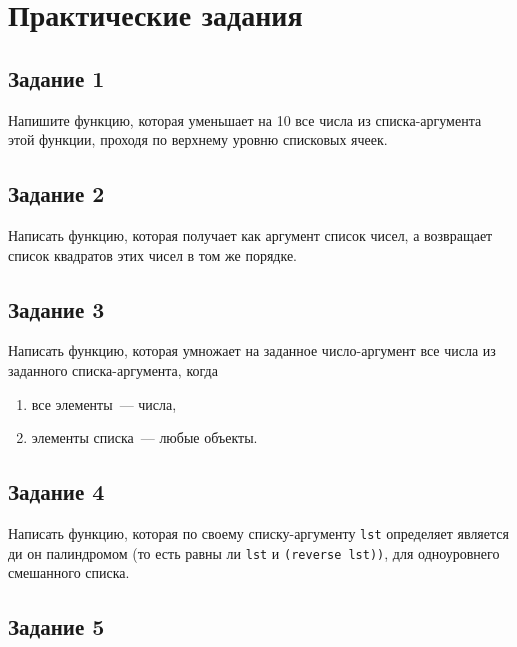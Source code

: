 \chapter{Практические задания}

\section{Задание 1}

Напишите функцию, которая уменьшает на 10 все числа из списка-аргумента этой функции, проходя по верхнему уровню списковых ячеек.


\section{Задание 2}

Написать функцию, которая получает как аргумент список чисел, а возвращает список квадратов этих чисел в том же порядке.


\section{Задание 3}

Написать функцию, которая умножает на заданное число-аргумент все числа из заданного списка-аргумента, когда
\begin{enumerate}[label=\alph*)]
	\item все элементы~--- числа,
	\item элементы списка~--- любые объекты.
\end{enumerate}


\section{Задание 4}

Написать функцию, которая по своему списку-аргументу \texttt{lst} определяет является ди он палиндромом (то есть равны ли \texttt{lst} и \texttt{(reverse lst))}, для одноуровнего смешанного списка.


\section{Задание 5}

